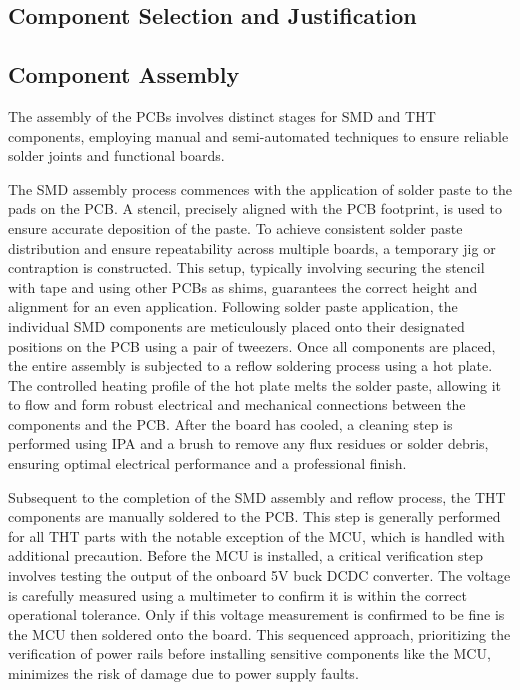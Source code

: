 \subsection{Component Selection and Justification}

\subsection{Component Assembly}\label{sec:component_assembly}
The assembly of the \ac{PCB}s involves distinct stages for \ac{SMD} and \ac{THT} components, employing manual and semi-automated techniques to ensure reliable solder joints and functional boards. \\

\begin{description}[style=nextline]
	\item[\ac{SMD}] The \ac{SMD} assembly process commences with the application of solder paste to the pads on the \ac{PCB}. A stencil, precisely aligned with the \ac{PCB} footprint, is used to ensure accurate deposition of the paste. To achieve consistent solder paste distribution and ensure repeatability across multiple boards, a temporary jig or contraption is constructed. This setup, typically involving securing the stencil with tape and using other \ac{PCB}s as shims, guarantees the correct height and alignment for an even application. Following solder paste application, the individual \ac{SMD} components are meticulously placed onto their designated positions on the \ac{PCB} using a pair of tweezers. Once all components are placed, the entire assembly is subjected to a reflow soldering process using a hot plate. The controlled heating profile of the hot plate melts the solder paste, allowing it to flow and form robust electrical and mechanical connections between the components and the \ac{PCB}. After the board has cooled, a cleaning step is performed using \ac{IPA} and a brush to remove any flux residues or solder debris, ensuring optimal electrical performance and a professional finish.
	
	\item[\ac{THT}] Subsequent to the completion of the \ac{SMD} assembly and reflow process, the \ac{THT} components are manually soldered to the \ac{PCB}. This step is generally performed for all \ac{THT} parts with the notable exception of the \ac{MCU}, which is handled with additional precaution. Before the \ac{MCU} is installed, a critical verification step involves testing the output of the onboard 5V buck \ac{DCDC} converter. The voltage is carefully measured using a multimeter to confirm it is within the correct operational tolerance. Only if this voltage measurement is confirmed to be fine is the \ac{MCU} then soldered onto the board. This sequenced approach, prioritizing the verification of power rails before installing sensitive components like the \ac{MCU}, minimizes the risk of damage due to power supply faults.
\end{description}
